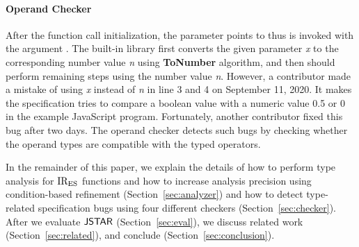 \paragraph{Operand Checker} After the function call initialization, the
parameter  points to  thus  is invoked
with the argument .  The  built-in library first
converts the given parameter \textit{x} to the corresponding number value
\textit{n} using \textbf{ToNumber} algorithm, and then should perform remaining
steps using the number value \textit{n}.  However, a contributor made a mistake
of using \textit{x} instead of \textit{n} in line 3 and 4 on September 11, 2020.
It makes the specification tries to compare a boolean value  with a
numeric value 0.5 or 0 in the example JavaScript program.  Fortunately, another
contributor fixed this bug after two days.  The operand checker detects such
bugs by checking whether the operand types are compatible with the typed
operators.

In the remainder of this paper, we explain the details of how to perform type
analysis for ${\text{IR}_\text{ES}}$ functions and how to increase analysis precision using
condition-based refinement (Section~\ref{sec:analyzer}) and how to detect
type-related specification bugs using four different checkers
(Section~\ref{sec:checker}).  After we evaluate $\tool$
(Section~\ref{sec:eval}), we discuss related work (Section~\ref{sec:related}),
and conclude (Section~\ref{sec:conclusion}).
